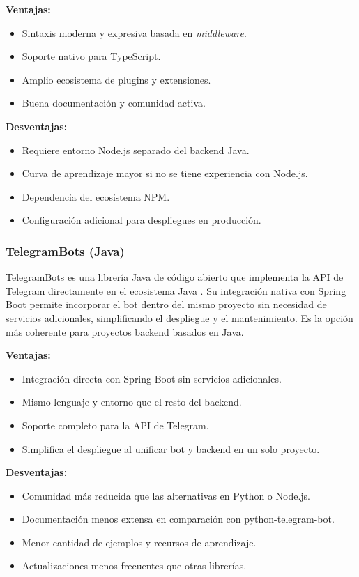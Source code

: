 \textbf{Ventajas:}
\begin{itemize}
    \item Sintaxis moderna y expresiva basada en \textit{middleware}.
    \item Soporte nativo para TypeScript.
    \item Amplio ecosistema de plugins y extensiones.
    \item Buena documentación y comunidad activa.
\end{itemize}

\textbf{Desventajas:}
\begin{itemize}
    \item Requiere entorno Node.js separado del backend Java.
    \item Curva de aprendizaje mayor si no se tiene experiencia con Node.js.
    \item Dependencia del ecosistema NPM.
    \item Configuración adicional para despliegues en producción.
\end{itemize}

\subsubsection{TelegramBots (Java)}
TelegramBots es una librería Java de código abierto que implementa la API de Telegram directamente en el ecosistema Java \cite{telegramBotsDocs}. Su integración nativa con Spring Boot permite incorporar el bot dentro del mismo proyecto sin necesidad de servicios adicionales, simplificando el despliegue y el mantenimiento. Es la opción más coherente para proyectos backend basados en Java.

\textbf{Ventajas:}
\begin{itemize}
    \item Integración directa con Spring Boot sin servicios adicionales.
    \item Mismo lenguaje y entorno que el resto del backend.
    \item Soporte completo para la API de Telegram.
    \item Simplifica el despliegue al unificar bot y backend en un solo proyecto.
\end{itemize}

\textbf{Desventajas:}
\begin{itemize}
    \item Comunidad más reducida que las alternativas en Python o Node.js.
    \item Documentación menos extensa en comparación con python-telegram-bot.
    \item Menor cantidad de ejemplos y recursos de aprendizaje.
    \item Actualizaciones menos frecuentes que otras librerías.
\end{itemize}

